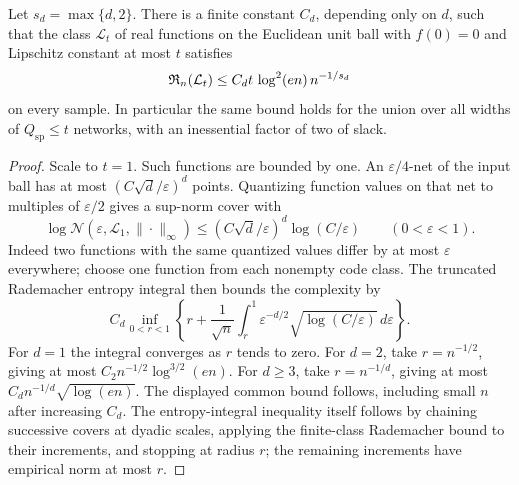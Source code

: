 \begin{lemma}
\label{lem:Lipschitz-capacity}
Let $s_d=\max\{d,2\}$. There is a finite constant $C_d$, depending only on $d$, such that the class $\mathcal L_t$ of real functions on the Euclidean unit ball with $f(0)=0$ and Lipschitz constant at most $t$ satisfies
\[
 \mathfrak R_n(\mathcal L_t)\le C_dt\,\log^2(en)\,n^{-1/s_d}
\]
on every sample. In particular the same bound holds for the union over all widths of $Q_{\mathrm{sp}}\le t$ networks, with an inessential factor of two of slack.
\end{lemma}
\begin{proof}
Scale to $t=1$. Such functions are bounded by one. An $\varepsilon/4$-net of the input ball has at most $(C\sqrt d/\varepsilon)^d$ points. Quantizing function values on that net to multiples of $\varepsilon/2$ gives a sup-norm cover with
\[
 \log\mathcal N(\varepsilon,\mathcal L_1,\|\cdot\|_\infty)
 \le(C\sqrt d/\varepsilon)^d\log(C/\varepsilon)
 \qquad(0<\varepsilon<1).
\]
Indeed two functions with the same quantized values differ by at most $\varepsilon$ everywhere; choose one function from each nonempty code class. The truncated Rademacher entropy integral then bounds the complexity by
\[
 C_d\inf_{0<r<1}\left\{r+\frac1{\sqrt n}
        \int_r^1\varepsilon^{-d/2}\sqrt{\log(C/\varepsilon)}\,d\varepsilon\right\}.
\]
For $d=1$ the integral converges as $r$ tends to zero. For $d=2$, take $r=n^{-1/2}$, giving at most $C_2n^{-1/2}\log^{3/2}(en)$. For $d\ge3$, take $r=n^{-1/d}$, giving at most $C_dn^{-1/d}\sqrt{\log(en)}$. The displayed common bound follows, including small $n$ after increasing $C_d$. The entropy-integral inequality itself follows by chaining successive covers at dyadic scales, applying the finite-class Rademacher bound to their increments, and stopping at radius $r$; the remaining increments have empirical norm at most $r$.
\end{proof}

